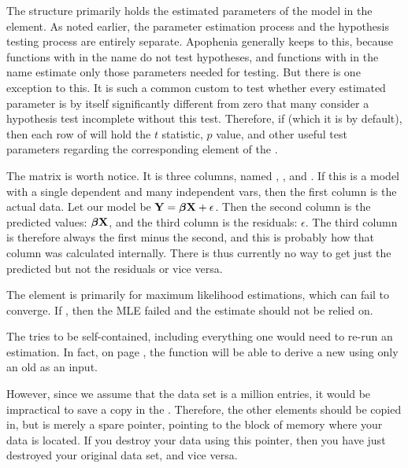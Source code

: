 The  structure primarily holds the estimated
parameters of the model in the 
element. As noted earlier, the parameter estimation process and the
hypothesis testing process are entirely separate. Apophenia generally
keeps to this, because functions with  in the name do not
test hypotheses, and functions with  in the name estimate
only those parameters needed for testing. But there is one exception
to this. It is such a common custom to test whether every estimated
parameter is by itself significantly different from zero that many
consider a hypothesis test incomplete without this test. Therefore, if
 (which it is by default), then 
each row of  will hold the $t$ statistic,
$p$ value, and other useful test parameters regarding the corresponding
element of the .

The  matrix is worth notice. It is three columns, named 
, , and . 
 If this is a model with a single dependent and many
independent vars, then the first column is the actual data. Let our
model be ${\bf Y} = {\mbox{\boldmath$\beta$}} {\bf X} + \epsilon$. Then the second column is the
predicted values: ${\mbox{\boldmath$\beta$}} {\bf X}$, and the third column is the residuals:
$\epsilon$. The third column is therefore always the first minus
the second, and this is probably how that column was calculated
internally. There is thus currently no way to get just the predicted
but not the residuals or vice versa.

The  element is primarily for maximum likelihood
estimations, which can fail to converge. If ,
then the MLE failed and the estimate should not be relied on.

The  tries to be self-contained, including
everything one would need to re-run an estimation. In fact, on page
\pageref{restart}, the  function will be
able to derive a new  using only an old
 as an input. 

However, since we assume that the data set is a million entries, it
would be impractical to save a copy in the .
Therefore, the other elements should be copied in, but
 is merely a spare
pointer, pointing to the block of memory where your data is located. If
you destroy your data using this pointer, then you have just destroyed
your original data set, and vice versa.


